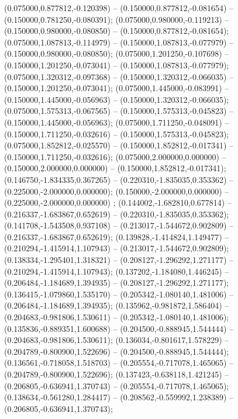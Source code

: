  (0.075000,0.877812,-0.120398) -- (0.150000,0.877812,-0.081654) -- (0.150000,0.781250,-0.080391);
 (0.075000,0.980000,-0.119213) -- (0.150000,0.980000,-0.080850) -- (0.150000,0.877812,-0.081654);
 (0.075000,1.087813,-0.114979) -- (0.150000,1.087813,-0.077979) -- (0.150000,0.980000,-0.080850);
 (0.075000,1.201250,-0.107698) -- (0.150000,1.201250,-0.073041) -- (0.150000,1.087813,-0.077979);
 (0.075000,1.320312,-0.097368) -- (0.150000,1.320312,-0.066035) -- (0.150000,1.201250,-0.073041);
 (0.075000,1.445000,-0.083991) -- (0.150000,1.445000,-0.056963) -- (0.150000,1.320312,-0.066035);
 (0.075000,1.575313,-0.067565) -- (0.150000,1.575313,-0.045823) -- (0.150000,1.445000,-0.056963);
 (0.075000,1.711250,-0.048091) -- (0.150000,1.711250,-0.032616) -- (0.150000,1.575313,-0.045823);
 (0.075000,1.852812,-0.025570) -- (0.150000,1.852812,-0.017341) -- (0.150000,1.711250,-0.032616);
 (0.075000,2.000000,0.000000) -- (0.150000,2.000000,0.000000) -- (0.150000,1.852812,-0.017341);
 (0.146750,-1.834335,0.367265) -- (0.220310,-1.835035,0.353362) -- (0.225000,-2.000000,0.000000);
 (0.150000,-2.000000,0.000000) -- (0.225000,-2.000000,0.000000) ;
 (0.144002,-1.682810,0.677814) -- (0.216337,-1.683867,0.652619) -- (0.220310,-1.835035,0.353362);
 (0.141708,-1.543508,0.937108) -- (0.213017,-1.544672,0.902809) -- (0.216337,-1.683867,0.652619);
 (0.139828,-1.414824,1.149477) -- (0.210294,-1.415914,1.107943) -- (0.213017,-1.544672,0.902809);
 (0.138334,-1.295401,1.318321) -- (0.208127,-1.296292,1.271177) -- (0.210294,-1.415914,1.107943);
 (0.137202,-1.184080,1.446245) -- (0.206484,-1.184689,1.394935) -- (0.208127,-1.296292,1.271177);
 (0.136415,-1.079860,1.535170) -- (0.205342,-1.080140,1.481006) -- (0.206484,-1.184689,1.394935);
 (0.135962,-0.981872,1.586404) -- (0.204683,-0.981806,1.530611) -- (0.205342,-1.080140,1.481006);
 (0.135836,-0.889351,1.600688) -- (0.204500,-0.888945,1.544444) -- (0.204683,-0.981806,1.530611);
 (0.136034,-0.801617,1.578229) -- (0.204789,-0.800900,1.522696) -- (0.204500,-0.888945,1.544444);
 (0.136561,-0.718058,1.518703) -- (0.205554,-0.717078,1.465065) -- (0.204789,-0.800900,1.522696);
 (0.137423,-0.638118,1.421245) -- (0.206805,-0.636941,1.370743) -- (0.205554,-0.717078,1.465065);
 (0.138634,-0.561280,1.284417) -- (0.208562,-0.559992,1.238389) -- (0.206805,-0.636941,1.370743);
